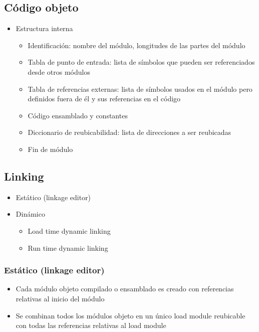 \subsection{Código objeto}
	\begin{itemize}
	\item Estructura interna
		\begin{itemize}
		\item Identificación: nombre del módulo, longitudes de las partes del módulo
		\item Tabla de punto de entrada: lista de símbolos que pueden ser referenciados desde otros módulos
		\item Tabla de referencias externas: lista de símbolos usados en el módulo pero definidos fuera de él y sus referencias en el código
		\item Código ensamblado y constantes
		\item Diccionario de reubicabilidad: lista de direcciones a ser reubicadas
		\item Fin de módulo
		\end{itemize}
	\end{itemize}

\subsection{Linking}
	\begin{itemize}
	\item Estático (linkage editor)
	\item Dinámico
		\begin{itemize}
		\item Load time dynamic linking
		\item Run time dynamic linking
		\end{itemize}
	\end{itemize}

	\subsubsection{Estático (linkage editor)}
		\begin{itemize}
		\item Cada módulo objeto compilado o ensamblado es creado con referencias relativas al inicio del módulo
		\item Se combinan todos los módulos objeto en un único load module reubicable con todas las referencias relativas al load module
		\end{itemize}

